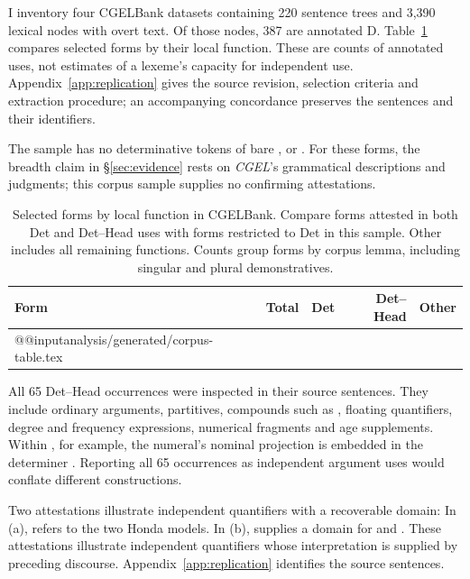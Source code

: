 \documentclass[12pt]{article}
\makeatletter
\newcommand{\tablebody}[1]{\csname @@input\endcsname #1 }
\makeatother
\begin{document}
I inventory four CGELBank datasets containing 220 sentence trees and 3,390 lexical nodes with overt text. Of those nodes, 387 are annotated D. Table~\ref{tab:corpus} compares selected forms by their local function. These are counts of annotated uses, not estimates of a lexeme's capacity for independent use. Appendix~\ref{app:replication} gives the source revision, selection criteria and extraction procedure; an accompanying concordance preserves the sentences and their identifiers.

The sample has no determinative tokens of bare ,  or . For these forms, the breadth claim in §\ref{sec:evidence} rests on \textit{CGEL}'s grammatical descriptions and judgments; this corpus sample supplies no confirming attestations.

\begin{table}[tb]
\centering\small
\caption{Selected forms by local function in CGELBank. Compare forms attested in both Det and Det--Head uses with forms restricted to Det in this sample. Other includes all remaining functions. Counts group forms by corpus lemma, including singular and plural demonstratives.}\label{tab:corpus}
\begin{tabular}{lrrrr}
\toprule
Form & Total & Det & Det--Head & Other \\
\midrule
\tablebody{analysis/generated/corpus-table.tex}
\bottomrule
\end{tabular}
\end{table}

All 65 Det--Head occurrences were inspected in their source sentences. They include ordinary arguments, partitives, compounds such as , floating quantifiers, degree and frequency expressions, numerical fragments and age supplements. Within , for example, the numeral's nominal projection is embedded in the determiner . Reporting all 65 occurrences as independent argument uses would conflate different constructions.

Two attestations illustrate independent quantifiers with a recoverable domain:
\ea\label{ex:attested-quantifiers}
\ea {}
\ex {}
\z\z
In (a),  refers to the two Honda models. In (b),  supplies a domain for  and . These attestations illustrate independent quantifiers whose interpretation is supplied by preceding discourse. Appendix~\ref{app:replication} identifies the source sentences.
\end{document}
